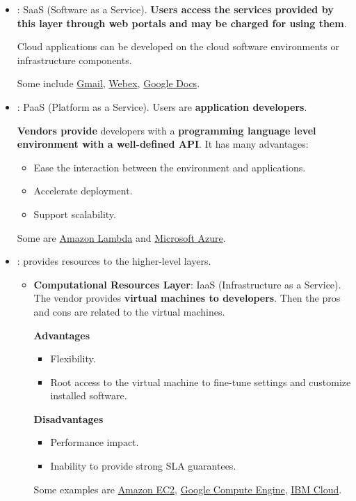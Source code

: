 \begin{itemize}
	\item {}: SaaS (Software as a Service). \textbf{Users access the services provided by this layer through web portals and may be charged for using them}.
	
	Cloud applications can be developed on the cloud software environments or infrastructure components. 
	
	Some  include \href{https://www.google.com/intl/en/gmail/about/}{Gmail}, \href{https://www.webex.com/}{Webex}, \href{https://www.google.com/intl/en/docs/about/}{Google Docs}.
	
	
	\item {}: PaaS (Platform as a Service). Users are \textbf{application developers}.
	
	\textbf{Vendors provide} developers with a \textbf{programming language level environment with a well-defined API}. It has many advantages:
	\begin{itemize}
		\item Ease the interaction between the environment and applications.
		\item Accelerate deployment.
		\item Support scalability.
	\end{itemize}
	
	Some  are \href{https://aws.amazon.com/lambda/}{Amazon Lambda} and \href{https://azure.microsoft.com/en-US}{Microsoft Azure}.
	
	
	\item {}: provides resources to the higher-level layers.
	\begin{itemize}
		\item \textbf{Computational Resources Layer}: IaaS (Infrastructure as a Service). The vendor provides \textbf{virtual machines to developers}. Then the pros and cons are related to the virtual machines.
		
		\begin{flushleft}
			\textcolor{Green3}{ \textbf{Advantages}}
		\end{flushleft}
		\begin{itemize}
			\item Flexibility.
			\item Root access to the virtual machine to fine-tune settings and customize installed software.
		\end{itemize}
		\newpage
		\begin{flushleft}
			\textcolor{Red2}{ \textbf{Disadvantages}}
		\end{flushleft}
		\begin{itemize}
			\item Performance impact.
			\item Inability to provide strong SLA guarantees.
		\end{itemize}
		Some examples are \href{https://aws.amazon.com/ec2/}{Amazon EC2}, \href{https://cloud.google.com/products/compute?hl=en}{Google Compute Engine}, \href{https://www.ibm.com/cloud}{IBM Cloud}.
		

\end{itemize}
\end{itemize}
